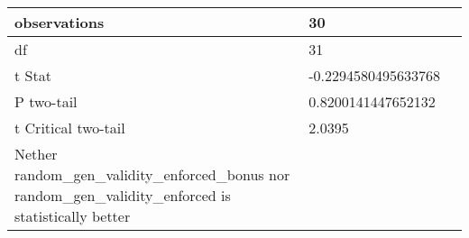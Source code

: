 \documentclass[11pt]{article}
\begin{document}
\begin{table}[H]
{\begin{tabular}{|l|l|l|}
    observations                                                                                              & 30                              &                                        \\ \hline
    df                                                                                                        & 31                              &                                        \\ \hline
    t Stat                                                                                                    & -0.2294580495633768             &                                        \\ \hline
    P two-tail                                                                                                & 0.8200141447652132              &                                        \\ \hline
    t Critical two-tail                                                                                       & 2.0395                          &                                        \\ \hline
    Nether random\_gen\_validity\_enforced\_bonus nor random\_gen\_validity\_enforced is statistically better &                                 &                                        \\ \hline
    \end{tabular}%
    }
\end{table}
\end{document}
